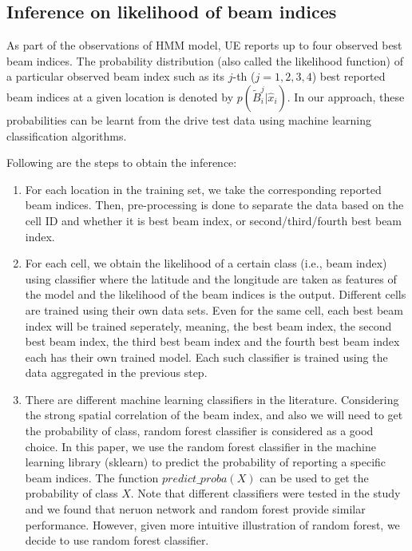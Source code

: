 \documentclass[conference, 10pt]{IEEEtran}
\begin{document}
\subsection{Inference on likelihood of beam indices}
\label{sec:prob-classification}
As part of the observations of HMM model, UE reports up to four observed best beam indices. The probability
distribution (also called the likelihood function) of a particular observed beam index such as its $j$-th ($j=1, 2, 3, 4$) best reported beam indices
at a given location is denoted by
$p(\tilde{B}^j_i|\hat{x}_{i})$. In our approach, these probabilities
can be learnt from the drive test data using machine learning classification algorithms.

Following are the steps to obtain the inference:

\begin{enumerate}

\item For each location in the training set, we
take the corresponding reported beam indices. Then, pre-processing is done to separate the data based on the cell ID and whether it is best beam index, or second/third/fourth best beam index.

\item For each cell, we obtain the likelihood of a certain class (i.e., beam index) using classifier where the latitude and the longitude are 
taken as features of the model and the likelihood of the beam indices is the output. Different cells are trained using their own data sets. Even for the same
cell, each best beam index will be trained seperately, meaning, the best beam index, the second best beam index, the third best beam index and the fourth best beam index each has their own trained model.
Each such classifier is trained using the data aggregated in the previous step.

\item There are different machine learning classifiers in the literature. Considering the strong spatial correlation of the beam index, and also we will need to get the probability of class, random forest classifier is considered as a good choice. 
In this paper, we use the random forest classifier in the machine learning library (sklearn) to predict the probability of 
reporting a specific beam indices. The function $predict\_proba(X)$ can be used to get the probability of class $X$. Note that different classifiers were tested in the study and we found that
neruon network and random forest provide similar performance. However, given more intuitive illustration of random forest, we decide to use random forest classifier.
\end{enumerate}
\end{document}
